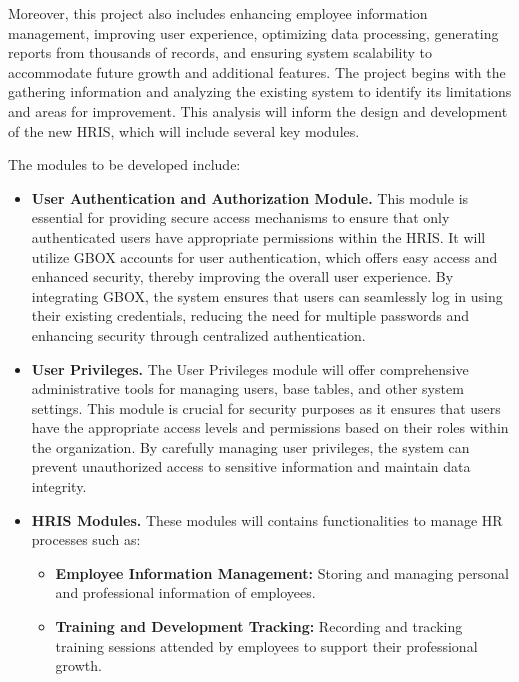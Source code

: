     Moreover, this project also includes enhancing employee information management, improving user experience, optimizing data processing, generating reports from thousands of records, and ensuring system scalability to accommodate future growth and additional features. The project begins with the gathering information and analyzing the existing system to identify its limitations and areas for improvement. This analysis will inform the design and development of the new HRIS, which will include several key modules.
    
    The modules to be developed include:
    
    \begin{itemize}
        \item[] \textbf{User Authentication and Authorization Module.} This module is essential for providing secure access mechanisms to ensure that only authenticated users have appropriate permissions within the HRIS. It will utilize GBOX accounts for user authentication, which offers easy access and enhanced security, thereby improving the overall user experience. By integrating GBOX, the system ensures that users can seamlessly log in using their existing credentials, reducing the need for multiple passwords and enhancing security through centralized authentication.
        \item[] \textbf{User Privileges.} The User Privileges module will offer comprehensive administrative tools for managing users, base tables, and other system settings. This module is crucial for security purposes as it ensures that users have the appropriate access levels and permissions based on their roles within the organization. By carefully managing user privileges, the system can prevent unauthorized access to sensitive information and maintain data integrity.
        \item[] \textbf{HRIS Modules.} These modules will contains functionalities to manage HR processes such as:
        \begin{itemize}
            \item[] \textbf{Employee Information Management:}
            Storing and managing personal and professional information of employees.


            \item[] \textbf{Training and Development Tracking: } Recording and tracking training sessions attended by employees to support their professional growth.
            

\end{itemize}
\end{itemize}
